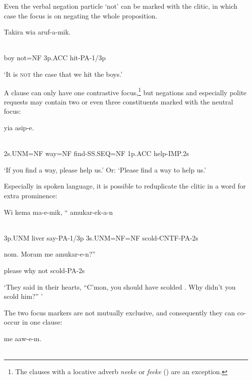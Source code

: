 Even the verbal negation particle  `not' can be marked with the  clitic, in which case the focus is on negating the whole proposition.

\ea%
\label{ex:x1728}
\gll Takira    wia  aruf-a-mik. \\
      \\
\glt
\z

boy  not=NF  3p.ACC  hit-PA-1/3p

`It is \textsc{not} the case that we hit the boys.'

A clause can only have one contrastive focus,\footnote{The clauses with a locative adverb \textit{neeke} or \textit{feeke} () are an exception.}  but negations and especially polite requests may contain two or even three constituents marked with the neutral focus:

\ea%
\label{ex:x1729}
\gll {}  yia  asip-e. \\
      \\
\glt
\z

2s.UNM=NF  way=NF  find-SS.SEQ=NF  1p.ACC  help-IMP.2s

`If you find a way, please help us.' Or: `Please find a way to help us.' 

Especially in spoken language, it is possible to reduplicate the  clitic in a word for extra prominence:

\ea%
\label{ex:x1731}
\gll Wi  kema  ma-e-mik,  ``  amukar-ek-a-n   \\
      \\
\glt
\z

3p.UNM  liver  say-PA-1/3p  3s.UNM=NF=NF  scold-CNTF-PA-2s  

nom.  Moram  me  amukar-e-n?''

please  why  not  scold-PA-2s

 `They said in their hearts, ``C'mon, you should have scolded . Why didn't you scold him?'' '

The two focus markers are not mutually exclusive, and consequently they can co-occur in one clause:

\ea%
\label{ex:x1737}
\gll {}  me  aaw-e-m. \\
      \\
\glt
\z

